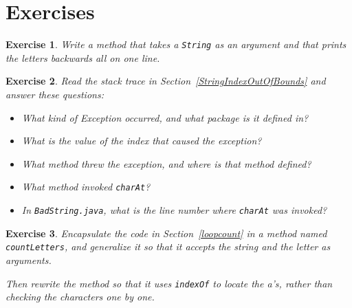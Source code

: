 \documentclass[12pt]{book}
\theoremstyle{exercise}
\newtheorem{exercise}{Exercise}[chapter]
\begin{document}
\section{Exercises}

\begin{exercise}
Write a method that takes a {\tt String}
as an argument and that prints the letters backwards all on
one line.
\end{exercise}

\begin{exercise}
Read the stack trace in Section~\ref{StringIndexOutOfBounds}
and answer these questions:

\begin{itemize}

\item What kind of Exception occurred, and what package is it defined
in?

\item What is the value of the index that caused the exception?

\item What method threw the exception, and where is
that method defined?

\item What method invoked {\tt charAt}?

\item In {\tt BadString.java}, what is the line number where {\tt charAt}
was invoked?

\end{itemize}

\end{exercise}

\begin{exercise}

Encapsulate the code in Section~\ref{loopcount} in a method named
{\tt countLetters}, and generalize it so that it accepts the
string and the letter as arguments.

Then rewrite the method so that it uses
{\tt indexOf} to locate the a's, rather than checking
the characters one by one.

\end{exercise}
\end{document}
